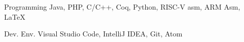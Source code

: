 

\begin{cvskills}

	\cvskill
	{Programming} %
	{Java, PHP, C/C++, Coq, Python, RISC-V asm, ARM Asm, \LaTeX} %

	\cvskill
	{Dev. Env.} %
	{Visual Studio Code, IntelliJ IDEA, Git, Atom} %

\end{cvskills}
